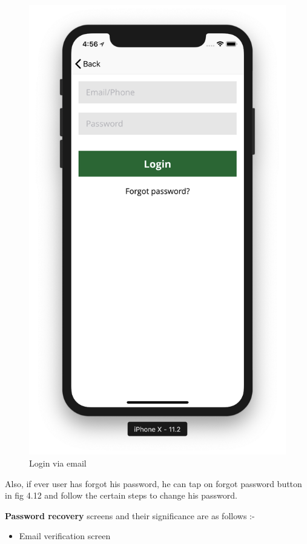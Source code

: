 \begin{itemize}
    \begin{figure}[H]
            \centering
            \includegraphics[width=0.5\linewidth]{figures/ch2/login_email.png}
            \caption{\label{fig:wireframe_3} Login via email}
    \end{figure}
    
    
    Also, if ever user has forgot his password, he can tap on forgot password button in fig 4.12 and follow the certain steps to change his password. \\
    
    \newpage
    
    \textbf{Password recovery} screens and their significance are as follows :-
    
    \begin{itemize}
        \item Email verification screen
        

\end{itemize}
\end{itemize}

